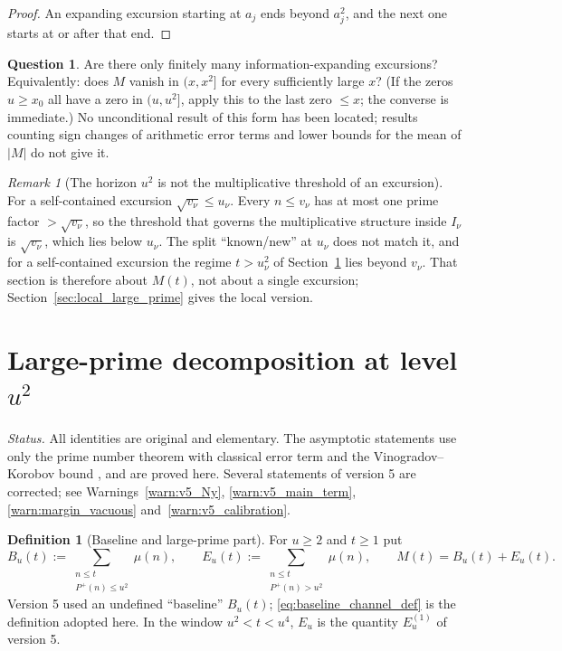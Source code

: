 \documentclass[11pt]{amsart}
\numberwithin{equation}{section}
\theoremstyle{plain}
\theoremstyle{definition}
\newtheorem{definition}[theorem]{Definition}
\newtheorem{question}[theorem]{Question}
\theoremstyle{remark}
\newtheorem{remark}[theorem]{Remark}
\newcommand{\Pp}{P^{+}}
\begin{document}
\begin{proof}
An expanding excursion starting at $a_j$ ends beyond $a_j^2$, and the next
one starts at or after that end.
\end{proof}

\begin{question}
\label{q:finiteness_expanding}
Are there only finitely many information-expanding excursions?
Equivalently: does $M$ vanish in $(x,x^2]$ for every sufficiently large $x$?
(If the zeros $u\ge x_0$ all have a zero in $(u,u^2]$, apply this to the
last zero $\le x$; the converse is immediate.) No unconditional result of
this form has been located; results counting sign changes of arithmetic
error terms and lower bounds for the mean of $|M|$ do not give it.
\end{question}

\begin{remark}[The horizon $u^2$ is not the multiplicative threshold of an excursion]
\label{rem:horizon_inactive}
For a self-contained excursion $\sqrt{v_\nu}\le u_\nu$. Every $n\le v_\nu$
has at most one prime factor $>\sqrt{v_\nu}$, so the threshold that governs
the multiplicative structure inside $I_\nu$ is $\sqrt{v_\nu}$, which lies
below $u_\nu$. The split ``known/new'' at $u_\nu$ does not match it, and for
a self-contained excursion the regime $t>u_\nu^2$ of
Section~\ref{sec:prime_copy_propagation} lies beyond $v_\nu$. That section
is therefore about $M(t)$, not about a single excursion;
Section~\ref{sec:local_large_prime} gives the local version.
\end{remark}

\section{Large-prime decomposition at level \texorpdfstring{$u^2$}{u^2}}
\label{sec:prime_copy_propagation}

\noindent\emph{Status.} All identities are original and elementary. The
asymptotic statements use only the prime number theorem with classical error
term and the Vinogradov--Korobov bound
\cite{MontgomeryVaughan2007,Walfisz1963}, and are proved here. Several
statements of version 5 are corrected; see
Warnings~\ref{warn:v5_Ny}, \ref{warn:v5_main_term},
\ref{warn:margin_vacuous} and~\ref{warn:v5_calibration}.

\begin{definition}[Baseline and large-prime part]
\label{def:baseline_channel}
For $u\ge2$ and $t\ge1$ put
\begin{equation}
\label{eq:baseline_channel_def}
  B_u(t):=\sum_{\substack{n\le t\\ \Pp(n)\le u^2}}\mu(n),\qquad
  E_u(t):=\sum_{\substack{n\le t\\ \Pp(n)>u^2}}\mu(n),\qquad
  M(t)=B_u(t)+E_u(t).
\end{equation}
Version 5 used an undefined ``baseline'' $B_u(t)$; \eqref{eq:baseline_channel_def}
is the definition adopted here. In the window $u^2<t<u^4$, $E_u$ is the
quantity $E_u^{(1)}$ of version 5.
\end{definition}
\end{document}
